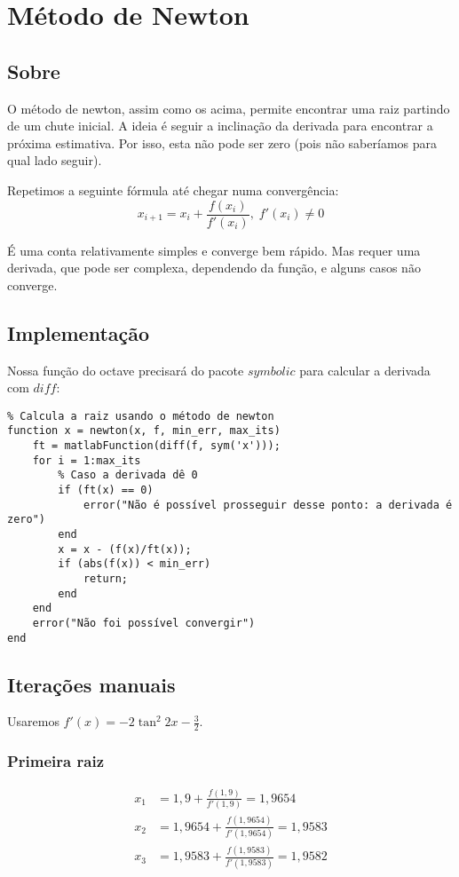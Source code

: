 \documentclass[12pt]{article}
\begin{document}
\section{Método de Newton}
\subsection{Sobre}
O método de newton, assim como os acima, permite encontrar uma raiz partindo de um chute inicial. A ideia é seguir a inclinação da derivada para encontrar a próxima estimativa. Por isso, esta não pode ser zero (pois não saberíamos para qual lado seguir).

Repetimos a seguinte fórmula até chegar numa convergência:
\[x_{i+1} = x_i + \frac{f(x_i)}{f'(x_i)},\; f'(x_i) \ne 0\]


É uma conta relativamente simples e converge bem rápido. Mas requer uma derivada, que pode ser complexa, dependendo da função, e alguns casos não converge.
\subsection{Implementação}
Nossa função do octave precisará do pacote \(symbolic\) para calcular a derivada com \(diff\):

\begin{verbatim}
% Calcula a raiz usando o método de newton
function x = newton(x, f, min_err, max_its)
    ft = matlabFunction(diff(f, sym('x')));
    for i = 1:max_its
        % Caso a derivada dê 0
        if (ft(x) == 0)
            error("Não é possível prosseguir desse ponto: a derivada é zero")
        end
        x = x - (f(x)/ft(x));
        if (abs(f(x)) < min_err)
            return;
        end
    end
    error("Não foi possível convergir")
end
\end{verbatim}
\subsection{Iterações manuais}
Usaremos \(f'(x) = -2\tan^2{2x} - \frac{3}{2}\).

\subsubsection{Primeira raiz}
\begin{align*}
    x_1 &= 1,9 + \frac{f(1,9)}{f'(1,9)} = 1,9654 \\
    x_2 &= 1,9654 + \frac{f(1,9654)}{f'(1,9654)} = 1,9583 \\
    x_3 &= 1,9583 + \frac{f(1,9583)}{f'(1,9583)} = 1,9582 \\
\end{align*}
\end{document}
